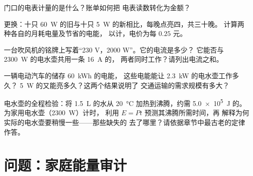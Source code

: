\begin{exercise}[$\star$]\label{exo:g9:electric-power-energy:8}
门口的电表计量的是什么？账单如何把
电表读数转化为金额？
\end{exercise}

\begin{exercise}[$\star\star$]\label{exo:g9:electric-power-energy:9}
更换：十只 \qty{60}{W} 的旧与十只
\qty{5}{W} 的新相比，每晚点亮四，共三十晚。
计算两种各自的月耗电量及节省的电能，
以计，电价为每 $0.25$ 元。
\end{exercise}

\begin{exercise}[$\star\star$]\label{exo:g9:electric-power-energy:10}
一台吹风机的铭牌上写着“230 V，2000 W”。它的电流是多少？
它能否与 \qty{2300}{W} 的电水壶共用一条 \qty{16}{A} 的，
两者同时工作？请列出电流之和。
\end{exercise}

\begin{exercise}[$\star\star$]\label{exo:g9:electric-power-energy:11}
一辆电动汽车的储存 \qty{60}{kWh} 的电能，
这些电能能让 \qty{2.3}{kW} 的电水壶工作多久？
\qty{5}{W} 的又能亮多久？这两个结果说明了
交通运输的需求规模有多大？
\end{exercise}

\begin{exercise}[$\star\star\star$]\label{exo:g9:electric-power-energy:12}
电水壶的全程检验：将 \qty{1.5}{L} 的水从
\qty{20}{\celsius} 加热到沸腾，约需 \qty{5.0e5}{J}
的。为家用电水壶（\qty{2300}{W}）计时，
利用 $E = P t$ 预测其沸腾所需时间，再
解释为何实际的电水壶要稍慢一些——那些缺失的
去了哪里？请依据章节中最古老的定律作答。
\end{exercise}

\section{问题：家庭能量审计}


